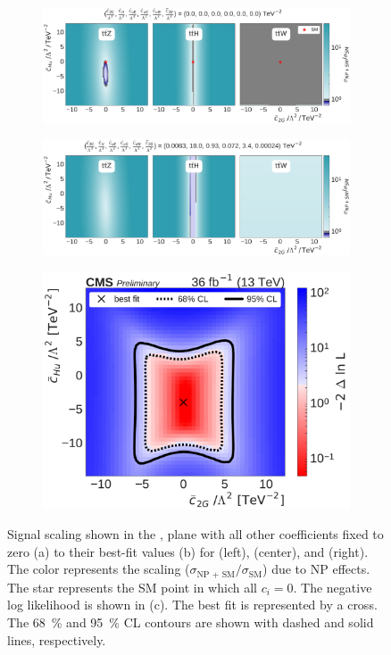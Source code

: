 \begin{figure}
  \vspace{-1cm}
  \begin{subfigure}{\linewidth}
    \centering
    \includegraphics[width=\linewidth]{figures/thirteen-TeV/scaling-frozen/c2G_cHu}
    \caption{}
  \end{subfigure}
  \begin{subfigure}{\linewidth}
    \centering
    \includegraphics[width=\linewidth]{figures/thirteen-TeV/scaling/c2G_cHu}
    \caption{}
  \end{subfigure}
  \begin{subfigure}{\linewidth}
    \centering
    \includegraphics[width=0.6\linewidth]{figures/thirteen-TeV/nll/c2G_cHu}
    \caption{}
  \end{subfigure}
  \vspace{-1cm}
  \setlength{\capwidth}{15cm}
  \setlength{\capwidth}{15cm}
  \caption[Signal scaling and profile likelihood scan in the \cHu, \ctwoG plane]{Signal scaling
    shown in the \cHu, \ctwoG plane with all other coefficients fixed to zero (a) to their best-fit
    values (b) for \ttZ (left), \ttH (center), and \ttW (right). The color represents the scaling
    ($\sigma_\text{NP + SM} / \sigma_\text{SM}$) due to NP effects. The star represents the SM point
    in which all $c_i=0$. The negative log likelihood is shown in (c). The best fit is represented
    by a cross. The \SI{68}{\percent} and \SI{95}{\percent} CL contours are shown with dashed and
    solid lines, respectively.}
\end{figure}

